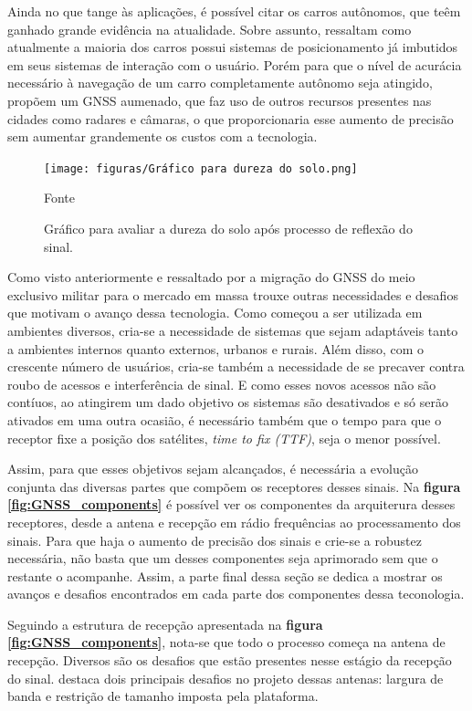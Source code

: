 Ainda no que tange às aplicações, é possível citar os carros autônomos, que teêm ganhado grande evidência na atualidade. Sobre assunto, \cite{Cosart2020} ressaltam como atualmente a maioria dos carros possui sistemas de posicionamento já imbutidos em seus sistemas de interação com o usuário. Porém para que o nível de acurácia necessário à navegação de um carro completamente autônomo seja atingido, propõem um GNSS aumenado, que faz uso de outros recursos presentes nas cidades como radares e câmaras, o que proporcionaria esse aumento de precisão sem aumentar grandemente os custos com a tecnologia.

\begin{figure}[h] 
    \centering
    \caption{Gráfico para avaliar a dureza do  solo após processo de reflexão do sinal.}
    \label{fig:dureza_do_solo_gráfico}
    \texttt{[image: figuras/Gráfico para dureza do solo.png]}
    
    Fonte \cite{Teunissen2017}
\end{figure}

Como visto anteriormente e ressaltado por \cite{Userreport2020} a migração do GNSS do meio exclusivo militar para o mercado em massa trouxe outras necessidades e desafios que motivam o avanço dessa tecnologia. Como começou a ser utilizada em ambientes diversos, cria-se a necessidade de sistemas que sejam adaptáveis tanto a ambientes internos quanto externos, urbanos e rurais. Além disso, com o crescente número de usuários, cria-se também a necessidade de se precaver contra roubo de acessos e interferência de sinal. E como esses novos acessos não são contíuos, ao atingirem um dado objetivo os sistemas são desativados e só serão ativados em uma outra ocasião, é necessário também que o tempo para que o receptor fixe a posição dos satélites, \textit{time to fix (TTF)}, seja o menor possível. 

Assim, para que esses objetivos sejam alcançados, é necessária a evolução conjunta das diversas partes que compõem os receptores desses sinais. Na \textbf{figura \ref{fig:GNSS_components}} é possível ver os componentes da arquiterura desses receptores, desde a antena e recepção em rádio frequências ao processamento dos sinais. Para que haja o aumento de precisão dos sinais e crie-se a robustez necessária, não basta que um desses componentes seja aprimorado sem que o restante o acompanhe. Assim, a parte final dessa seção se dedica a mostrar os avanços e desafios encontrados em cada parte dos componentes dessa teconologia. 

Seguindo a estrutura de recepção apresentada na \textbf{figura \ref{fig:GNSS_components}}, nota-se que todo o processo começa na antena de recepção. Diversos são os desafios que estão presentes nesse estágio da recepção do sinal. \cite{Antennas2012} destaca dois principais desafios no projeto dessas antenas: largura de banda e restrição de tamanho imposta pela plataforma.

